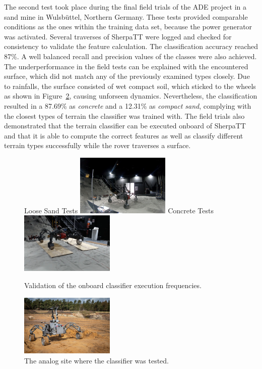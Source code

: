 \documentclass{article}
\begin{document}
The second test took place during the final field trials of the ADE project \cite{ocon2021} in a sand mine in Wulsbüttel, Northern Germany.
These tests provided comparable conditions as the ones within the training data set, because the power generator was activated. Several traverses of SherpaTT were logged and checked for consistency to validate the feature calculation. The classification accuracy reached 87\%. A well balanced recall and precision values of the classes were also achieved. 
The underperformance in the field tests can be explained with the encountered surface, which did not match any of the previously examined types closely. Due to rainfalls, the surface consisted of wet compact soil, which sticked to the wheels as shown in Figure~\ref{fig:finaltest}, causing unforseen dynamics.
Nevertheless, the classification resulted in a 87.69\% as \emph{concrete} and a 12.31\% as \emph{compact sand}, complying with the closest types of terrain the classifier was trained with.
The field trials also demonstrated that the terrain classifier can be executed onboard of SherpaTT and that it is able to compute the correct features as well as classify different terrain types successfully while the rover traverses a surface.

\begin{figure}[!t]
    \centering
    \subcaptionbox
        {Loose Sand Tests}
        {
        \includegraphics[width=0.4\textwidth]{../figures/spacehall.png}
        }
    \subcaptionbox
        {Concrete Tests}
        {\includegraphics[width=0.4\textwidth]{../figures/spacehallconcrete.png}}
    \caption{Validation of the onboard classifier execution frequencies.}
    \label{fig:sh-tests}
\end{figure}

\begin{figure}[!h]
    \centering
        \includegraphics[width=0.4\textwidth]{../figures/sandmine_v2.jpg}
    \caption{The analog site where the classifier was tested.}
    \label{fig:finaltest}
\end{figure}
\end{document}
